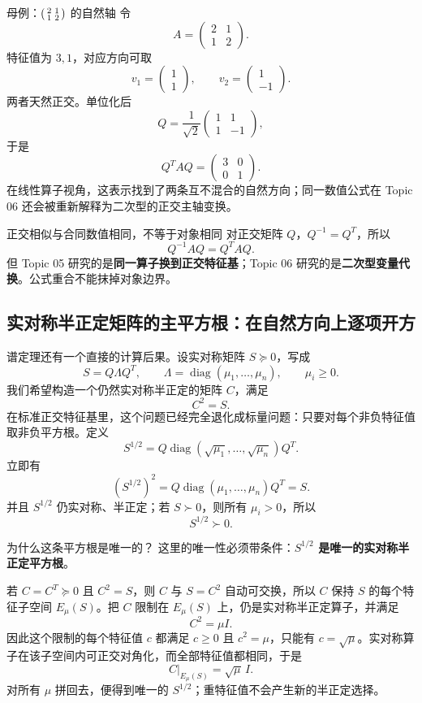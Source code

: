 \documentclass[11pt,a4paper]{ctexart}
\newcommand{\kw}[1]{\textbf{\color{deep}#1}}
\begin{document}
\begin{examplebox}{母例：$\begin{psmallmatrix}2&1\\1&2\end{psmallmatrix}$ 的自然轴}
令
\[
A=\begin{pmatrix}2&1\\1&2\end{pmatrix}.
\]
特征值为 $3,1$，对应方向可取
\[
v_1=\begin{pmatrix}1\\1\end{pmatrix},
\qquad
v_2=\begin{pmatrix}1\\-1\end{pmatrix}.
\]
两者天然正交。单位化后
\[
Q=\frac1{\sqrt2}
\begin{pmatrix}1&1\\1&-1\end{pmatrix},
\]
于是
\[
Q^TAQ=\begin{pmatrix}3&0\\0&1\end{pmatrix}.
\]
在线性算子视角，这表示找到了两条互不混合的自然方向；同一数值公式在 Topic 06 还会被重新解释为二次型的正交主轴变换。
\end{examplebox}

\begin{warnbox}{正交相似与合同数值相同，不等于对象相同}
对正交矩阵 $Q$，$Q^{-1}=Q^T$，所以
\[
Q^{-1}AQ=Q^TAQ.
\]
但 Topic 05 研究的是\kw{同一算子换到正交特征基}；Topic 06 研究的是\kw{二次型变量代换}。公式重合不能抹掉对象边界。
\end{warnbox}

\subsection{实对称半正定矩阵的主平方根：在自然方向上逐项开方}

谱定理还有一个直接的计算后果。设实对称矩阵 $S\succeq0$，写成
\[
S=Q\Lambda Q^T,
\qquad
\Lambda=\operatorname{diag}(\mu_1,\dots,\mu_n),
\qquad \mu_i\ge0.
\]
我们希望构造一个仍然实对称半正定的矩阵 $C$，满足
\[
C^2=S.
\]
在标准正交特征基里，这个问题已经完全退化成标量问题：只要对每个非负特征值取非负平方根。定义
\[
\boxed{
S^{1/2}
=Q\operatorname{diag}(\sqrt{\mu_1},\dots,\sqrt{\mu_n})Q^T.
}
\]
立即有
\[
(S^{1/2})^2
=Q\operatorname{diag}(\mu_1,\dots,\mu_n)Q^T
=S.
\]
并且 $S^{1/2}$ 仍实对称、半正定；若 $S\succ0$，则所有 $\mu_i>0$，所以
\[
\boxed{S^{1/2}\succ0.}
\]

\begin{corebox}{为什么这条平方根是唯一的？}
这里的唯一性必须带条件：\kw{$S^{1/2}$ 是唯一的实对称半正定平方根}。

若 $C=C^T\succeq0$ 且 $C^2=S$，则 $C$ 与 $S=C^2$ 自动可交换，所以 $C$ 保持 $S$ 的每个特征子空间 $E_\mu(S)$。把 $C$ 限制在 $E_\mu(S)$ 上，仍是实对称半正定算子，并满足
\[
C^2=\mu I.
\]
因此这个限制的每个特征值 $c$ 都满足 $c\ge0$ 且 $c^2=\mu$，只能有 $c=\sqrt\mu$。实对称算子在该子空间内可正交对角化，而全部特征值都相同，于是
\[
C\vert_{E_\mu(S)}=\sqrt\mu\,I.
\]
对所有 $\mu$ 拼回去，便得到唯一的 $S^{1/2}$；重特征值不会产生新的半正定选择。
\end{corebox}
\end{document}
